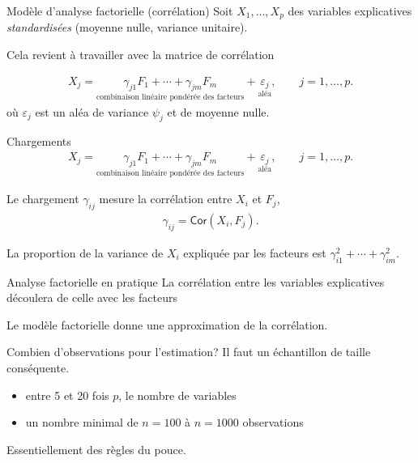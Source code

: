 \documentclass[
  ignorenonframetext,
]{beamer}
\providecommand{\tightlist}{%
  \setlength{\itemsep}{0pt}\setlength{\parskip}{0pt}}\usepackage{longtable,booktabs,array}
\begin{document}
\begin{frame}{Modèle d'analyse factorielle (corrélation)}
\protect\hypertarget{moduxe8le-danalyse-factorielle-corruxe9lation}{}
Soit \(X_1, \ldots, X_p\) des variables explicatives
\emph{standardisées} (moyenne nulle, variance unitaire).

Cela revient à travailler avec la matrice de corrélation

\begin{align*}
X_j = \underset{\text{combinaison linéaire pondérée des facteurs}}{\gamma_{j1}F_1 + \cdots + \gamma_{jm}F_m} + \underset{\text{aléa}}{\varepsilon_j},\qquad j=1, \ldots, p.
\end{align*} où \(\varepsilon_j\) est un aléa de variance \(\psi_j\) et
de moyenne nulle.
\end{frame}

\begin{frame}{Chargements}
\protect\hypertarget{chargements}{}
\begin{align*}
X_j = \underset{\text{combinaison linéaire pondérée des facteurs}}{\gamma_{j1}F_1 + \cdots + \gamma_{jm}F_m} + \underset{\text{aléa}}{\varepsilon_j}, \qquad j=1, \ldots, p.
\end{align*}

Le chargement \(\gamma_{ij}\) mesure la corrélation entre \(X_i\) et
\(F_j\), \begin{align*}
\gamma_{ij} = \mathsf{Cor}(X_i, F_j).
\end{align*}

La proportion de la variance de \(X_i\) expliquée par les facteurs est
\(\gamma_{i1}^2 + \cdots + \gamma_{im}^2\).
\end{frame}

\begin{frame}{Analyse factorielle en pratique}
\protect\hypertarget{analyse-factorielle-en-pratique}{}
La corrélation entre les variables explicatives découlera de celle avec
les facteurs

Le modèle factorielle donne une approximation de la corrélation.
\end{frame}

\begin{frame}{Combien d'observations pour l'estimation?}
\protect\hypertarget{combien-dobservations-pour-lestimation}{}
Il faut un échantillon de taille conséquente.

\begin{itemize}
\tightlist
\item
  entre 5 et 20 fois \(p\), le nombre de variables
\item
  un nombre minimal de \(n=100\) à \(n=1000\) observations
\end{itemize}

Essentiellement des règles du pouce.
\end{frame}
\end{document}
